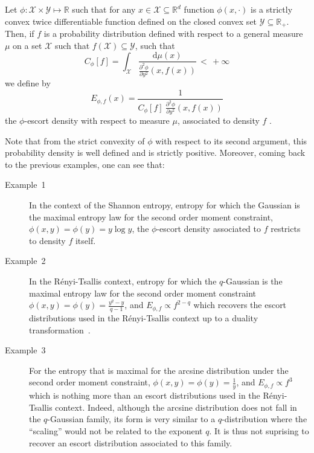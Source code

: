 \documentclass[entropy,article,submit,moreauthors,pdftex]{Definitions/mdpi}
\def\dmu{\mathrm{d}\mu}
\def\Rset{\mathbb{R}}
\def\X{\mathcal{X}}
\def\Y{\mathcal{Y}}
\begin{document}
\begin{Definition}\label{def:phi-escort}
  Let $\phi: \X \times  \Y \mapsto \Rset$ such that for any  $x \in \X \subseteq
  \Rset^d$ function  $\phi(x,\cdot)$ is  a strictly convex  twice differentiable
  function defined  on the closed convex  set $\Y \subseteq \Rset_+$.   Then, if
  $f$ is  a probability distribution defined  with respect to a  general measure
  $\mu$ on a set $\X$ such that $f(\X) \subseteq \Y$, such that
  \begin{equation}
  \label{eq:Cphi}
  C_\phi[f] = \int_\X \frac{\dmu(x)}{\frac{\partial^2 \phi}{\partial
      y^2}(x,f(x))} \, < \, + \infty
  \end{equation}
  we define by
  \begin{equation}\label{eq:phi-escort}
  E_{\phi,f}(x) = \frac{1}{\displaystyle C_\phi[f] \: \frac{\partial^2
    \phi}{\partial y^2}(x,f(x))}
  \end{equation}
  the $\phi$-escort density with respect to measure $\mu$, associated to density
  $f$ .
\end{Definition}
%
Note  that from  the  strict convexity  of  $\phi$ with  respect  to its  second
argument,   this  probability   density  is   well  defined   and  is   strictly
positive. Moreover, coming back to the previous examples, one can see that:
%
\begin{description}
\item[Example~1] In  the context of the  Shannon entropy, entropy for  which the
  Gaussian is  the maximal entropy law  for the second order  moment constraint,
  $\phi(x,y) = \phi(y) = y \log  y$, the $\phi$-escort density associated to $f$
  restricts to density $f$ itself.
%
\item[Example~2]  In   the  R\'enyi-Tsallis  context,  entropy   for  which  the
  $q$-Gaussian is the maximal entropy law for the second order moment constraint
  $\phi(x,y) =  \phi(y) =  \frac{y^q-y}{q-1}$, and $E_{\phi,f}  \propto f^{2-q}$
  which recovers the escort distributions used in the R\'enyi-Tsallis context up
  to a duality transformation~\cite{Nau11}.
\item[Example~3] For  the entropy that  is maximal for the  arcsine distribution
  under the second order moment constraint, $\phi(x,y) = \phi(y) = \frac{1}{y}$,
  and  $E_{\phi,f}   \propto  f^3$  which   is  nothing  more  than   an  escort
  distributions  used  in the  R\'enyi-Tsallis  context.   Indeed, although  the
  arcsine distribution  does not fall  in the  $q$-Gaussian family, its  form is
  very similar to a $q$-distribution where  the ``scaling'' would not be related
  to  the  exponent  $q$.   It  is  thus not  suprising  to  recover  an  escort
  distribution associated to this family.
\end{description}
\end{document}
